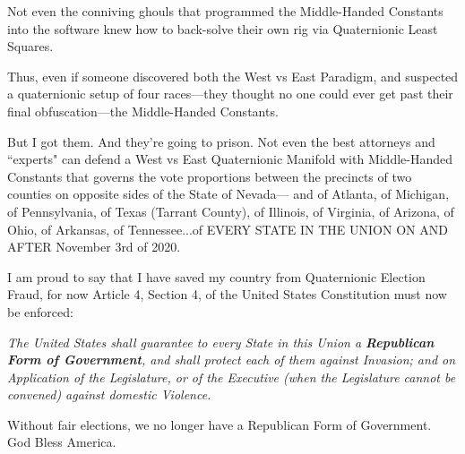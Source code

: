 \documentclass[preprint,13pt]{elsarticle}
\begin{document}
Not even the conniving ghouls that programmed the Middle-Handed Constants into the software knew how to back-solve their own rig via Quaternionic Least Squares. 

Thus, even if someone discovered both the West vs East Paradigm, and suspected a quaternionic setup of four races---they thought no one could ever get past their final obfuscation---the Middle-Handed Constants.

But I got them. And they're going to prison. Not even the best attorneys and ``experts" can defend a West vs East Quaternionic Manifold with Middle-Handed Constants that governs the vote proportions between the precincts of two counties on opposite sides of the State of Nevada--- and of Atlanta, of Michigan, of Pennsylvania, of Texas (Tarrant County), of Illinois, of Virginia, of Arizona, of Ohio, of Arkansas, of Tennessee...of EVERY STATE IN THE UNION ON AND AFTER November 3rd of 2020.

I am proud to say that I have saved my country from Quaternionic Election Fraud, for now Article 4, Section 4, of the United States Constitution must now be enforced:

\textit{The United States shall guarantee to every State in this Union a \textbf{Republican Form of Government}, and shall protect each of them against Invasion; and on Application of the Legislature, or of the Executive (when the Legislature cannot be convened) against domestic Violence.}

Without fair elections, we no longer have a Republican Form of Government. God Bless America.
\newpage
\end{document}
